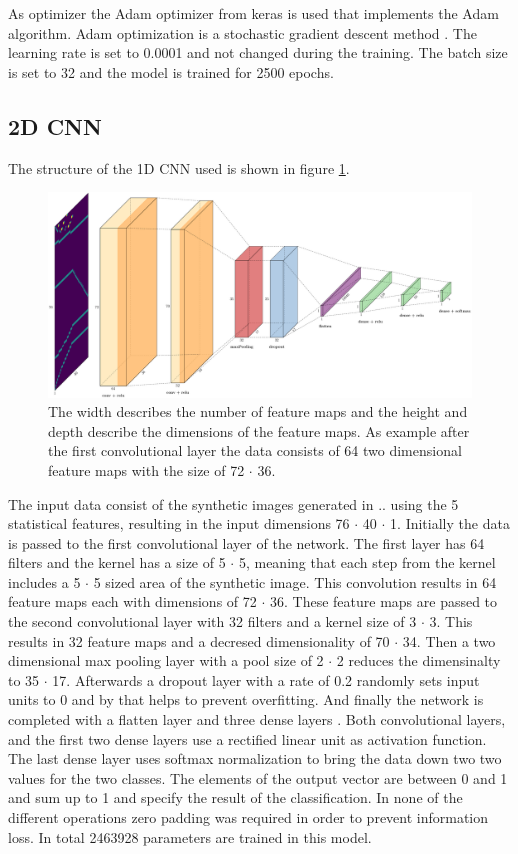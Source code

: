 As optimizer the Adam optimizer from keras is used that implements the Adam algorithm. Adam optimization is a stochastic gradient descent method . The learning rate is set to 0.0001 and not changed during the training. The batch size is set to 32 and the model is trained for 2500 epochs. 

\subsection{2D CNN}
The structure of the 1D CNN used is shown in figure \ref{fig:2dCnnStructure}.
\begin{figure}[H]
	\centering
	\includegraphics[width=15cm]{images/2dCnnStructure_new.png}
	\caption[Bild kurz]{The width describes the number of feature maps and the height and depth describe the dimensions of the feature maps. As example after the first convolutional layer the data consists of 64 two dimensional feature maps with the size of 72 $\cdot$ 36.}
	\label{fig:2dCnnStructure}
\end{figure}
The input data consist of the synthetic images generated in ..  using the 5 statistical features, resulting in the input dimensions 76 $\cdot$ 40 $\cdot$ 1. Initially the data is passed to the first convolutional layer of the network. The first layer has 64 filters and the kernel has a size of 5 $\cdot$ 5, meaning that each step from the kernel includes a 5 $\cdot$ 5 sized area of the synthetic image. This convolution results in 64 feature maps each with dimensions of 72 $\cdot$ 36. These feature maps are passed to the second convolutional layer with 32 filters and a kernel size of 3 $\cdot$ 3. This results in 32 feature maps and a decresed dimensionality of 70 $\cdot$ 34. Then a two dimensional max pooling layer with a pool size of 2 $\cdot$ 2 reduces the dimensinalty to 35 $\cdot$ 17. Afterwards a dropout layer with a rate of 0.2 randomly sets input units to 0 and by that helps to prevent overfitting. And finally the network is completed with a flatten layer and three dense layers . Both convolutional layers, and the first two dense layers use a rectified linear unit as activation function. The last dense layer uses softmax normalization to bring the data down two two values for the two classes. The elements of the output vector are between 0 and 1 and sum up to 1 and specify the result of the classification. In none of the different operations zero padding was required in order to prevent information loss. In total 2463928 parameters are trained in this model.

